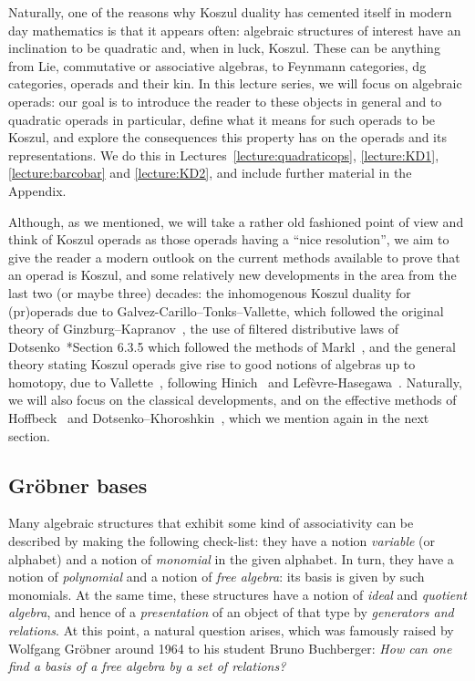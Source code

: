 Naturally, one of the reasons why Koszul duality has cemented
itself in modern day mathematics is that it appears often:
algebraic structures of interest have an inclination to be
quadratic and, when in luck, Koszul. These can be anything
from Lie, commutative or associative algebras, to Feynmann
categories, dg categories, operads and their kin. In this
lecture series, we will focus on algebraic operads: our goal
is to introduce the reader to these objects in general
and to quadratic operads in particular, define what
it means for such operads to be Koszul, and explore
the consequences this property has on the operads
and its representations. We do this in 
Lectures~\ref{lecture:quadraticops}, \ref{lecture:KD1}, 
\ref{lecture:barcobar} and \ref{lecture:KD2}, and include 
further material in the Appendix.

Although, as we
mentioned, we will take a rather old fashioned point of 
view and think of Koszul operads as those operads 
having a ``nice resolution'', we aim to give the reader
a modern outlook on the current methods available to
prove that an operad is Koszul, and some relatively 
new developments in the area from the last two (or
maybe three) decades:
the inhomogenous Koszul duality for (pr)operads due
to Galvez-Carillo--Tonks--Vallette, which
followed the original theory of 
Ginzburg--Kapranov~\cite{Ginzburg1994},
the use of filtered distributive laws 
of Dotsenko~\cite{Bremner2016}*{Section 6.3.5}
which followed the methods of Markl~\cite{MarklDistributive}, 
and the general theory stating Koszul operads give rise to good
notions of algebras up to homotopy, due to Vallette~\cite{Vallette2020},
following Hinich~\cite{Hinich2001} and Lefèvre-Hasegawa~\cite{LH03}.
Naturally, we will also focus on the classical developments,
and on the effective methods of Hoffbeck~\cite{Hoffbeck2009} and 
Dotsenko--Khoroshkin~\cite{Dotsenko2010}, which we mention again in
the next section.

\subsection{Gr\"obner bases}
Many algebraic structures that exhibit some kind of 
associativity can be described by making the following check-list:
they have a notion \emph{variable} (or alphabet) and a notion 
of \emph{monomial} in the given alphabet. In turn, they have
a notion of \emph{polynomial} and a notion of \emph{free algebra}:
its basis is given by such monomials.
At the same time, these structures have a notion of \emph{ideal} and
\emph{quotient algebra}, and hence of a \emph{presentation} of an object of that
type by \emph{generators and relations}.
At this point, a natural question arises, which was 
famously raised by Wolfgang Gr\"obner around 1964 to his student Bruno
Buchberger: \emph{How can one find a basis of a free algebra by
a set of relations?} 

